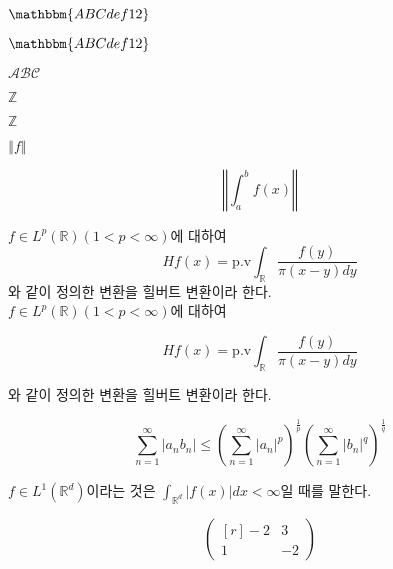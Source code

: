 \documentclass[footnote]{oblivoir}
\theoremstyle{definition}
\newcommand{\bZ}{{\mathbb{Z}}}
\newcommand{\norm}[1]{{\left \Vert #1 \right \Vert}}
\begin{document}
$\mathbbm{ABCdef12}$

$\mathbbm{ABCdef12}$

$\mathcal{ABC}$




$\mathbb{Z}$

$\bZ$

$\norm{f}$

\[ \norm{\int_a^b f(x)} \]

$f\in L^p(\mathbb{R}) (1<p<\infty)$에 대하여 \[ Hf(x) = \mathrm{p.v} \int_{\mathbb{R}} \frac{f(y)}{\pi (x-y)dy}  \]
와 같이 정의한 변환을 힐버트 변환이라 한다. \\

$f\in L^p(\mathbb{R}) (1<p<\infty)$에 대하여

\[Hf(x) = \mathrm{p.v} \int_{\mathbb{R}} \frac{f(y)}{\pi (x-y)dy}  \]

와 같이 정의한 변환을 힐버트 변환이라 한다.

\[ \sum_{n=1}^\infty |a_n b_n| \leq \left( \sum_{n=1}^\infty |a_n|^p \right)^{\frac{1}{p}} \left(\sum_{n=1}^\infty |b_n|^q \right)^{\frac{1}{q}}
\]

$f\in {L^1(\mathbb{R}^d)}$이라는 것은 $\displaystyle \int_{\mathbb{R}^d} |f(x)|dx <\infty$일 때를 말한다.

\[
\begin{pmatrix*}[r]
-2 & 3\\
1  & -2
\end{pmatrix*}
\]
\end{document}
